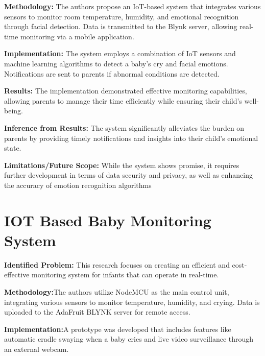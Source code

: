 \documentclass[12pt,a4paper]{report}
\begin{document}
\noindent\textbf{Methodology:} The authors propose an IoT-based system that integrates various sensors to monitor room temperature, humidity, and emotional recognition through facial detection. Data is transmitted to the Blynk server, allowing real-time monitoring via a mobile application.
\setlength{\parskip}{1em}  %

\noindent\textbf{Implementation:} The system employs a combination of IoT sensors and machine learning algorithms to detect a baby's cry and facial emotions. Notifications are sent to parents if abnormal conditions are detected.
\setlength{\parskip}{1em}  %

\noindent\textbf{Results:} The implementation demonstrated effective monitoring capabilities, allowing parents to manage their time efficiently while ensuring their child's well-being.
\setlength{\parskip}{1em}  %

\noindent\textbf{Inference from Results:} The system significantly alleviates the burden on parents by providing timely notifications and insights into their child's emotional state.
\setlength{\parskip}{1em}  %

\noindent\textbf{Limitations/Future Scope:} While the system shows promise, it requires further development in terms of data security and privacy, as well as enhancing the accuracy of emotion recognition algorithms
\setlength{\parskip}{1em}  %

\section{IOT Based Baby Monitoring System}
\textbf{Identified Problem: } This research focuses on creating an efficient and cost-effective monitoring system for infants that can operate in real-time\cite{Singh2021}.

\setlength{\parskip}{1em}  %

\noindent\textbf{Methodology:}The authors utilize NodeMCU as the main control unit, integrating various sensors to monitor temperature, humidity, and crying. Data is uploaded to the AdaFruit BLYNK server for remote access.
\setlength{\parskip}{1em}  %

\noindent\textbf{Implementation:}A prototype was developed that includes features like automatic cradle swaying when a baby cries and live video surveillance through an external webcam.
\setlength{\parskip}{1em}  %
\end{document}
